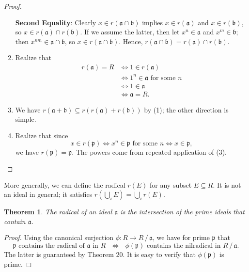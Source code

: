 \documentclass[11pt]{article}
\newtheorem{theorem}{Theorem}
\begin{document}
\begin{adjustwidth}{0.5cm}{}
\begin{proof}
\begin{enumerate}
			\textbf{Second Equality}: Clearly $x \in r(\mathfrak{a} \cap \mathfrak{b})$ implies $x \in r(\mathfrak{a})$ and $x \in r(\mathfrak{b})$, so $x \in r(\mathfrak{a}) \cap r(\mathfrak{b})$. If we assume the latter, then let $x^{n} \in \mathfrak{a}$ and $x^{m} \in \mathfrak{b}$; then $x^{nm} \in \mathfrak{a} \cap \mathfrak{b}$, so $x \in r(\mathfrak{a} \cap \mathfrak{b})$. Hence, $r(\mathfrak{a} \cap \mathfrak{b}) = r(\mathfrak{a}) \cap r(\mathfrak{b})$.
			\item Realize that
			\begin{align*}
				r(\mathfrak{a}) = R &\iff 1 \in r(\mathfrak{a}) \\
				&\iff 1^{n} \in \mathfrak{a} \text{ for some } n \\
				&\iff 1 \in \mathfrak{a} \\
				&\iff \mathfrak{a} = R.
			\end{align*}
			\item We have $r(\mathfrak{a} + \mathfrak{b}) \subseteq r(r(\mathfrak{a}) + r(\mathfrak{b}))$ by (1); the other direction is simple.
			\item Realize that since
			\[
				x \in r(\mathfrak{p}) \iff x^{n} \in \mathfrak{p} \text{ for some } n \iff x \in \mathfrak{p},
			\]
			we have $r(\mathfrak{p}) = \mathfrak{p}$. The powers come from repeated application of (3).
		\end{enumerate}
	\end{proof}
\end{adjustwidth}

\newpage

More generally, we can define the radical $r(E)$ for any subset $E \subseteq R$. It is not an ideal in general; it satisfies $r(\bigcup_{i} E) = \bigcup_{i} r(E)$.

\begin{adjustwidth}{0.5cm}{}
	\begin{theorem}
		The radical of an ideal $\mathfrak{a}$ is the intersection of the prime ideals that contain $\mathfrak{a}$.
	\end{theorem}
	\begin{proof}
		Using the canonical surjection $\phi : R \to R \,/\, \mathfrak{a}$, we have for prime $\mathfrak{p}$ that
		\[
			\text{$\mathfrak{p}$ contains the radical of $\mathfrak{a}$ in $R$ $\iff$ $\phi(\mathfrak{p})$ contains the nilradical in $R \,/\, \mathfrak{a}$}.
		\]
		The latter is guaranteed by Theorem 20. It is easy to verify that $\phi(\mathfrak{p})$ is prime.
	\end{proof}
\end{adjustwidth}
\end{document}
